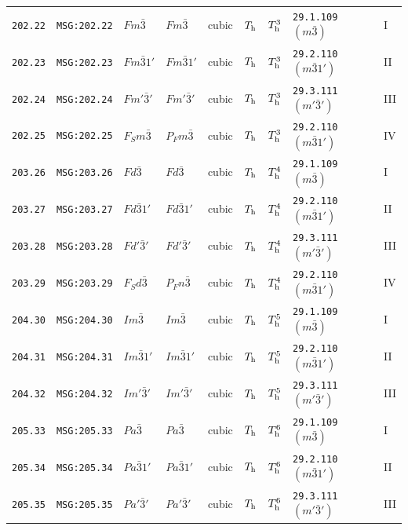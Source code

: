 \documentclass[fleqn,10pt]{jsarticle}
\begin{document}
\begin{center}
\begin{longtable}{lllllllll}
\texttt{202.22} & \texttt{MSG:202.22} & $Fm\bar{3}$ & $Fm\bar{3}$ & cubic & $T_{\rm h}$ & $T_{\rm h}^{3}$ & \texttt{29.1.109} $(m\bar{3})$ & I \\
\texttt{202.23} & \texttt{MSG:202.23} & $Fm\bar{3}1'$ & $Fm\bar{3}1'$ & cubic & $T_{\rm h}$ & $T_{\rm h}^{3}$ & \texttt{29.2.110} $(m\bar{3}1')$ & II \\
\texttt{202.24} & \texttt{MSG:202.24} & $Fm'\bar{3}'$ & $Fm'\bar{3}'$ & cubic & $T_{\rm h}$ & $T_{\rm h}^{3}$ & \texttt{29.3.111} $(m'\bar{3}')$ & III \\
\texttt{202.25} & \texttt{MSG:202.25} & $F_{S}m\bar{3}$ & $P_{F}m\bar{3}$ & cubic & $T_{\rm h}$ & $T_{\rm h}^{3}$ & \texttt{29.2.110} $(m\bar{3}1')$ & IV \\ \hline
\texttt{203.26} & \texttt{MSG:203.26} & $Fd\bar{3}$ & $Fd\bar{3}$ & cubic & $T_{\rm h}$ & $T_{\rm h}^{4}$ & \texttt{29.1.109} $(m\bar{3})$ & I \\
\texttt{203.27} & \texttt{MSG:203.27} & $Fd\bar{3}1'$ & $Fd\bar{3}1'$ & cubic & $T_{\rm h}$ & $T_{\rm h}^{4}$ & \texttt{29.2.110} $(m\bar{3}1')$ & II \\
\texttt{203.28} & \texttt{MSG:203.28} & $Fd'\bar{3}'$ & $Fd'\bar{3}'$ & cubic & $T_{\rm h}$ & $T_{\rm h}^{4}$ & \texttt{29.3.111} $(m'\bar{3}')$ & III \\
\texttt{203.29} & \texttt{MSG:203.29} & $F_{S}d\bar{3}$ & $P_{F}n\bar{3}$ & cubic & $T_{\rm h}$ & $T_{\rm h}^{4}$ & \texttt{29.2.110} $(m\bar{3}1')$ & IV \\ \hline
\texttt{204.30} & \texttt{MSG:204.30} & $Im\bar{3}$ & $Im\bar{3}$ & cubic & $T_{\rm h}$ & $T_{\rm h}^{5}$ & \texttt{29.1.109} $(m\bar{3})$ & I \\
\texttt{204.31} & \texttt{MSG:204.31} & $Im\bar{3}1'$ & $Im\bar{3}1'$ & cubic & $T_{\rm h}$ & $T_{\rm h}^{5}$ & \texttt{29.2.110} $(m\bar{3}1')$ & II \\
\texttt{204.32} & \texttt{MSG:204.32} & $Im'\bar{3}'$ & $Im'\bar{3}'$ & cubic & $T_{\rm h}$ & $T_{\rm h}^{5}$ & \texttt{29.3.111} $(m'\bar{3}')$ & III \\ \hline
\texttt{205.33} & \texttt{MSG:205.33} & $Pa\bar{3}$ & $Pa\bar{3}$ & cubic & $T_{\rm h}$ & $T_{\rm h}^{6}$ & \texttt{29.1.109} $(m\bar{3})$ & I \\
\texttt{205.34} & \texttt{MSG:205.34} & $Pa\bar{3}1'$ & $Pa\bar{3}1'$ & cubic & $T_{\rm h}$ & $T_{\rm h}^{6}$ & \texttt{29.2.110} $(m\bar{3}1')$ & II \\
\texttt{205.35} & \texttt{MSG:205.35} & $Pa'\bar{3}'$ & $Pa'\bar{3}'$ & cubic & $T_{\rm h}$ & $T_{\rm h}^{6}$ & \texttt{29.3.111} $(m'\bar{3}')$ & III \\

\end{longtable}
\end{center}
\end{document}
